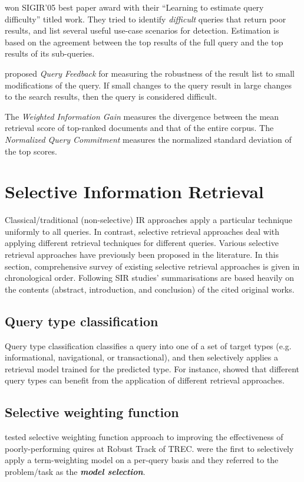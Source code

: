 \citet*{Yom05} won SIGIR'05 best paper award with their ``Learning to estimate query difficulty'' titled work. They tried to identify \emph{difficult} queries that return poor results, and list several useful use-case scenarios for detection. Estimation is based on the agreement between the top results of the full query and the top results of its sub-queries.  

\citet*{qf} proposed \emph{Query Feedback} for measuring the robustness of the result list to small modifications of the query.
If small changes to the query result in large changes to the search results, then the query is considered difficult.

The \emph{Weighted Information Gain} \citep{qf} measures the divergence between the mean retrieval score of top-ranked documents and that of the entire corpus. 
The \emph{Normalized Query Commitment} \citep{nqc} measures the normalized standard deviation of the top scores.

\section{Selective Information Retrieval}
Classical/traditional (non-selective) IR approaches apply a particular technique uniformly to all queries. 
In contrast, selective retrieval approaches deal with applying different retrieval techniques for different queries. 
Various selective retrieval approaches have previously been proposed in the literature. 
In this section, comprehensive survey of existing selective retrieval approaches is given in chronological order.
Following SIR studies' summarisations are based heavily on the contents (abstract, introduction, and conclusion) of the cited original works.

\subsection{Query type classification}
Query type classification classifies a query into one of a set of target types (e.g. informational, navigational, or transactional), and then selectively applies a retrieval model trained for the predicted type. For instance, \citet*{QueryTypeClassification} showed that different query types can benefit from the application of different retrieval approaches.

\subsection{Selective weighting function}
\citet{uglasgow.robust} tested selective weighting function approach to improving the effectiveness of poorly-performing quires at Robust Track of TREC.
\citet{uglasgow.robust,ModelSelection} were the first to selectively apply a term-weighting model on a per-query basis and they referred to the problem/task as the \textbf{\emph{model selection}}.

